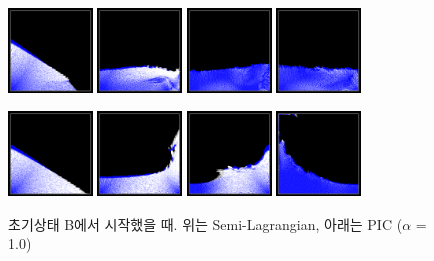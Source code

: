 \documentclass[11pt, A4]{article}
\begin{document}
\begin{figure}[h!]
  \centering
\includegraphics[width=0.20\textwidth]{semilag-state-b/img1}
\includegraphics[width=0.20\textwidth]{semilag-state-b/img2}
\includegraphics[width=0.20\textwidth]{semilag-state-b/img3}
\includegraphics[width=0.20\textwidth]{semilag-state-b/img4}

\includegraphics[width=0.20\textwidth]{pic-state-b/img1}
\includegraphics[width=0.20\textwidth]{pic-state-b/img2}
\includegraphics[width=0.20\textwidth]{pic-state-b/img3}
\includegraphics[width=0.20\textwidth]{pic-state-b/img4}
  \caption{초기상태 B에서 시작했을 때. 위는 Semi-Lagrangian, 아래는 PIC ($\alpha$ = 1.0)}
  \label{fluid-b}
\end{figure}
\end{document}
